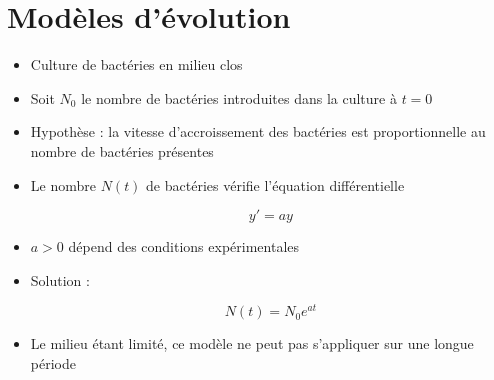 \section*{Modèles d'évolution}

\begin{frame}



\pause
\begin{itemize}
  \item Culture de bactéries en milieu clos
  \pause
  \item Soit $N_0$ le nombre de bactéries 
  introduites dans la culture à $t = 0$

\end{itemize}

\bigskip

\pause
{}

\pause
\begin{itemize}
  \item Hypothèse : la vitesse d'accroissement des bactéries 
est proportionnelle au nombre de bactéries présentes
  \pause
  \item Le nombre $N(t)$ de bactéries vérifie l'équation différentielle 
  
 \vspace*{-2ex} 
$$y' = ay$$
\vspace*{-2ex}

  \pause
  \item $a>0$ dépend des conditions expérimentales
  \pause
  \item Solution : 
  
  \vspace*{-3ex}
  $$N(t) = N_0 e^{at}$$
  \vspace*{-2ex}
  
  \pause
  \item Le milieu étant limité, ce modèle ne peut pas 
  s'appliquer sur une longue période
\end{itemize}

\end{frame}



